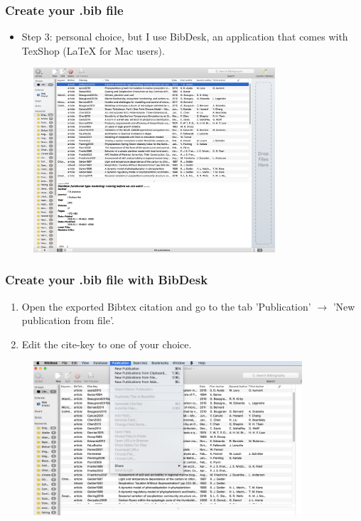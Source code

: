 \documentclass{beamer}
\begin{document}
\begin{frame}[fragile]
\frametitle{Create your .bib file}
\begin{itemize}
\item Step 3: personal choice, but I use BibDesk, an application that comes with TexShop (\LaTeX{} for Mac users).
\end{itemize}
\begin{figure}
\includegraphics[width=90mm]{figures/BibDesk.png}
\end{figure}
\end{frame}


\begin{frame}[fragile]
\frametitle{Create your .bib file with BibDesk}
\begin{enumerate}
\item Open the exported Bibtex citation and go to the tab 'Publication' $\rightarrow$ 'New publication from file'.\\
\item Edit the cite-key to one of your choice. \\
\end{enumerate}
\begin{figure}
\includegraphics[width=100mm]{figures/BibDesk1.png}
\end{figure}
\end{frame}
\end{document}
